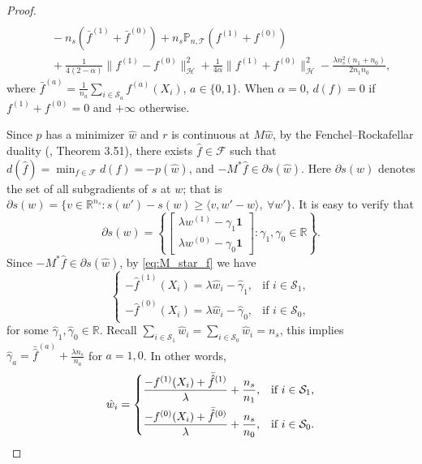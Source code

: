\documentclass[12pt]{article}
\newcommand{\prob}{\mathbb{P}}
\begin{document}
\begin{proof}
\begin{equation}
\begin{aligned}
			\\&\quad-
			n_s (\bar{f}^{(1)} + \bar{f}^{(0)}) +
			n_s \prob_{n, \mathcal{T}}(f^{(1)} + f^{(0)})
			\\&\quad+
			\frac{1}{4(2-\alpha)} \| f^{(1)} - f^{(0)} \|_\mathcal{H}^2 +
			\frac{1}{4\alpha} \| f^{(1)} + f^{(0)} \|_\mathcal{H}^2
			- \frac{\lambda n_s^2 (n_1 + n_0)}{2 n_1 n_0}
			,\end{aligned}
	\end{equation}
	where $\bar{f}^{(a)} = \frac{1}{n_a} \sum_{i \in \mathcal{S}_a} f^{(a)}(X_i)$, $a \in \{0, 1\}$. When $\alpha = 0$, $d(f) = 0$ if $f^{(1)} + f^{(0)} = 0$ and $+\infty$ otherwise.
	
	Since $p$ has a minimizer $\hat{w}$ and $r$ is continuous at $M \hat{w}$, by the Fenchel–Rockafellar duality (\citet{peypouquet2015convex}, Theorem 3.51), there exists $\hat{f} \in \mathcal{F}$ such that $d(\hat{f}) = \min_{f \in \mathcal{F}} d(f) = -p(\hat{w})$, and $-M^* \hat{f} \in \partial s(\hat{w})$. Here $\partial s(w)$ denotes the set of all subgradients of $s$ at $w$; that is $\partial s(w) = \{ v \in \mathbb{R}^{n_s}: s(w') - s(w) \ge \langle v, w' - w \rangle ,~\forall w' \}$. It is easy to verify that
	\begin{equation*}
		\partial s(w) = \left\{ \begin{bmatrix} 
			\lambda w^{(1)} - \gamma_1 \mathbf{1} \\ 
			\lambda w^{(0)} - \gamma_0 \mathbf{1} 
		\end{bmatrix}: \gamma_1, \gamma_0 \in \mathbb{R}  \right\}
		.\end{equation*}
	Since $-M^* \hat{f} \in \partial s(\hat{w})$, by \eqref{eq:M_star_f} we have
	\begin{equation*}
		\begin{cases}
			-\hat{f}^{(1)}(X_i) = \lambda \hat{w}_i - \hat{\gamma}_1, &\text{if } i \in \mathcal{S}_1, \\
			-\hat{f}^{(0)}(X_i) = \lambda \hat{w}_i - \hat{\gamma}_0, &\text{if } i \in \mathcal{S}_0,
		\end{cases}
	\end{equation*}
	for some $\hat{\gamma}_1, \hat{\gamma}_0 \in \mathbb{R}$. Recall $\sum_{i \in \mathcal{S}_1} \hat{w}_i = \sum_{i \in \mathcal{S}_0} \hat{w}_i = n_s$, this implies $\hat{\gamma}_a = \bar{\hat{f}}^{(a)} + \frac{\lambda n_s}{n_a}$ for $a = 1, 0$. In other words,
	\begin{equation}
		\label{eq:w_f}
		\hat{w}_i = 
		\begin{cases}
			\dfrac{-f^{(1)}(X_i) + \bar{\hat{f}}^{(1)}}{\lambda} + \dfrac{n_s}{n_1}, &\text{if } i \in \mathcal{S}_1, 
			\vspace{4pt} \\
			\dfrac{-f^{(0)}(X_i) + \bar{\hat{f}}^{(0)}}{\lambda} + \dfrac{n_s}{n_0}, &\text{if } i \in \mathcal{S}_0.
		\end{cases}
	\end{equation}
	

\end{proof}
\end{document}
